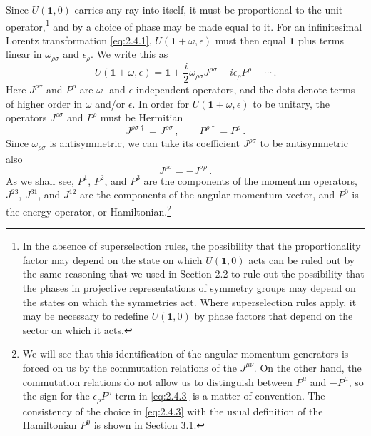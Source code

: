 Since $U(\mathbf{1},0)$ carries any ray into itself, it must be proportional to the unit
operator,\footnote{In the absence of superselection rules, the possibility that
the proportionality factor may depend on the state on which $U(\mathbf{1},0)$ acts can
be ruled out by the same reasoning that we used in Section 2.2 to rule out the
possibility that the phases in projective representations of symmetry groups
may depend on the states on which the symmetries act. Where superselection
rules apply, it may be necessary to redefine $U(\mathbf{1},0)$ by phase factors that
depend on the sector on which it acts.} and by a choice of phase may be made
equal to it. For an infinitesimal Lorentz transformation \eqref{eq:2.4.1},
$U(\mathbf{1}+\omega,\epsilon)$ must then equal $\mathbf{1}$ plus terms linear in $\omega_{\rho\sigma}$
and $\epsilon_\rho$. We write this as
\begin{equation}
U(\mathbf{1}+\omega,\epsilon)
=\mathbf{1}+\frac{i}{2}\omega_{\rho\sigma}J^{\rho\sigma}
-i\epsilon_\rho P^\rho+\cdots\,.
\tag{2.4.3}\label{eq:2.4.3}
\end{equation}
Here $J^{\rho\sigma}$ and $P^\rho$ are $\omega$- and $\epsilon$-independent
operators, and the dots denote terms of higher order in $\omega$ and/or
$\epsilon$. In order for $U(\mathbf{1}+\omega,\epsilon)$ to be unitary, the operators
$J^{\rho\sigma}$ and $P^\rho$ must be Hermitian
\begin{equation}
J^{\rho\sigma\dagger}=J^{\rho\sigma}\,,
\qquad P^{\rho\dagger}=P^\rho\,.
\tag{2.4.4}\label{eq:2.4.4}
\end{equation}
Since $\omega_{\rho\sigma}$ is antisymmetric, we can take its coefficient
$J^{\rho\sigma}$ to be antisymmetric also
\begin{equation}
J^{\rho\sigma}=-J^{\sigma\rho}\,.
\tag{2.4.5}\label{eq:2.4.5}
\end{equation}
As we shall see, $P^1$, $P^2$, and $P^3$ are the components of the momentum
operators, $J^{23}$, $J^{31}$, and $J^{12}$ are the components of the angular
momentum vector, and $P^0$ is the energy operator, or
Hamiltonian.\footnote{We will see that this identification of the
angular-momentum generators is forced on us by the commutation relations of
the $J^{\mu\nu}$. On the other hand, the commutation relations do not allow us
to distinguish between $P^\mu$ and $-P^\mu$, so the sign for the
$\epsilon_\rho P^\rho$ term in \eqref{eq:2.4.3} is a matter of convention. The
consistency of the choice in \eqref{eq:2.4.3} with the usual definition of the
Hamiltonian $P^0$ is shown in Section 3.1.}

